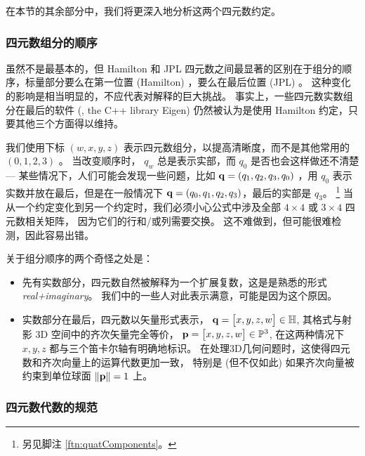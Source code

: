 在本节的其余部分中，我们将更深入地分析这两个四元数约定。


\subsubsection{四元数组分的顺序}

虽然不是最基本的，但 Hamilton 和 JPL 四元数之间最显著的区别在于组分的顺序，标量部分要么在第一位置 (Hamilton) ，要么在最后位置 (JPL) 。 
这种变化的影响是相当明显的，不应代表对解释的巨大挑战。 
事实上，一些四元数实数组分在最后的软件 (\eg, the C++ library Eigen) 仍然被认为是使用 Hamilton 约定，只要其他三个方面得以维持。

我们使用下标 $(w, x, y, z)$ 表示四元数组分，以提高清晰度，而不是其他常用的 $(0, 1, 2, 3)$ 。
当改变顺序时， $q_w$ 总是表示实部，而 $q_0$ 是否也会这样做还不清楚 
--- 某些情况下，人们可能会发现一些问题，比如 ${\bf q}=(q_1, q_2, q_3, q_0)$ ，用 $q_0$ 表示实数并放在最后，但是在一般情况下 ${\bf q}=(q_0, q_1, q_2, q_3)$，最后的实部是 $q_3$。%
\footnote{另见脚注 \ref{ftn:quatComponents}。} 
当从一个约定变化到另一个约定时，我们必须小心公式中涉及全部 $4\times4$ 或 $3\times4$ 四元数相关矩阵， 
因为它们的行和/或列需要交换。 
这不难做到，但可能很难检测，因此容易出错。

关于组分顺序的两个奇怪之处是：
%
\begin{itemize}
\item
先有实数部分，四元数自然被解释为一个扩展复数，这是是熟悉的形式 \emph{real+imaginary}。
我们中的一些人对此表示满意，可能是因为这个原因。
\item
实数部分在最后，四元数以矢量形式表示，
%
${\bf q}=\begin{bmatrix}
x,y,z,w
\end{bmatrix}\in{\mathbb H}$, 
%
其格式与射影 3D 空间中的齐次矢量完全等价， 
%
${\bf p}=\begin{bmatrix}
x,y,z,w
\end{bmatrix}\in{\mathbb P}^3$, 
%
在这两种情况下 $x,y,z$ 都与三个笛卡尔轴有明确地标识。 
在处理3D几何问题时，这使得四元数和齐次向量上的运算代数更加一致， 
特别是 (但不仅如此) 如果齐次向量被约束到单位球面 ${\left\|{\bf p}\right\|}=1$ 上。
\end{itemize}

\subsubsection{四元数代数的规范}


